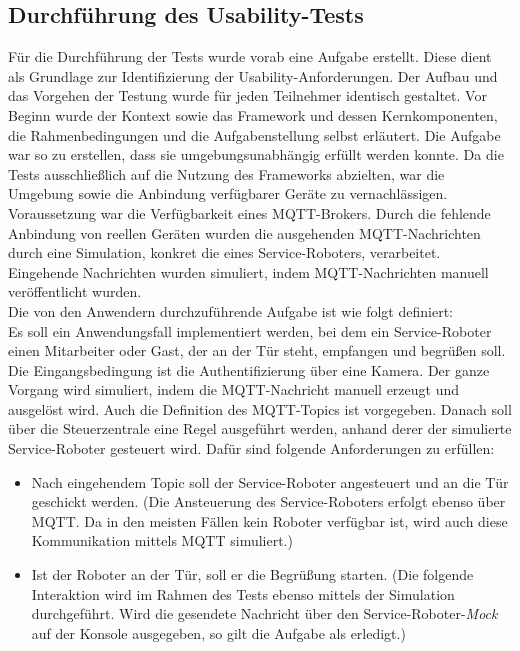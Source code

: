     \subsection{Durchführung des Usability-Tests}
        Für die Durchführung der Tests wurde vorab eine Aufgabe erstellt. Diese 
        dient als Grundlage zur Identifizierung der Usability-Anforderungen. Der Aufbau und das Vorgehen der Testung wurde für jeden Teilnehmer 
        identisch gestaltet. Vor Beginn wurde der Kontext sowie das Framework und dessen Kernkomponenten, die Rahmenbedingungen und die Aufgabenstellung selbst erläutert. 
        Die Aufgabe war so zu erstellen, dass sie umgebungsunabhängig erfüllt werden konnte. 
        Da die Tests ausschließlich auf die Nutzung des Frameworks abzielten, war die Umgebung sowie die 
        Anbindung verfügbarer Geräte zu vernachlässigen. Voraussetzung war die Verfügbarkeit eines \acs{MQTT}-Brokers. 
        Durch die fehlende Anbindung von reellen Geräten wurden die ausgehenden 
        \acs{MQTT}-Nachrichten durch eine Simulation, konkret die eines Service-Roboters, verarbeitet. Eingehende Nachrichten 
        wurden simuliert, indem \acs{MQTT}-Nachrichten manuell veröffentlicht wurden. 
        \\
        Die von den Anwendern durchzuführende Aufgabe ist wie folgt definiert: 
        \\
        \linebreak
        Es soll ein Anwendungsfall implementiert werden, bei dem ein Service-Roboter einen Mitarbeiter oder Gast, der an der Tür steht, 
        empfangen und begrüßen soll. Die Eingangsbedingung ist die Authentifizierung über eine Kamera. Der ganze Vorgang wird simuliert, indem die \acs{MQTT}-Nachricht manuell erzeugt und ausgelöst wird. 
        Auch die Definition des \acs{MQTT}-Topics ist vorgegeben. 
        Danach soll über die Steuerzentrale eine Regel ausgeführt werden, anhand derer der simulierte 
        Service-Roboter gesteuert wird. Dafür sind folgende Anforderungen zu erfüllen: 
        \begin{itemize}
            \item Nach eingehendem Topic soll der Service-Roboter angesteuert und an die Tür geschickt werden. 
            (Die Ansteuerung des Service-Roboters erfolgt ebenso über \acs{MQTT}. Da in den meisten Fällen kein Roboter verfügbar ist, wird auch 
            diese Kommunikation mittels \acs{MQTT} simuliert.)
            \item Ist der Roboter an der Tür, soll er die Begrüßung starten. (Die folgende Interaktion wird im Rahmen des Tests ebenso mittels der Simulation durchgeführt. 
            Wird die gesendete Nachricht über den Service-Roboter-\textit{Mock} auf der Konsole ausgegeben, so gilt die Aufgabe als erledigt.)
        \end{itemize}
